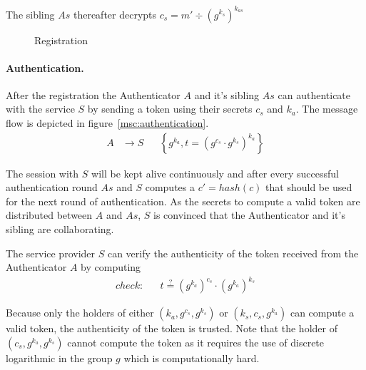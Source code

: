 The sibling $As$ thereafter decrypts $c_s = m' \div {\left(g^{k_s}\right)^{k_{as}}}$

\begin{figure}
\begin{msc}{Registration}

\setlength{\instdist}{2.5cm}
\setlength{\actionwidth}{2.6cm}

\nextlevel
{}
\nextlevel[3]
\nextlevel
{}
\nextlevel[3]
\end{msc}
\caption{}
\label{msc:registration}
\end{figure}

\paragraph{Authentication.}
After the registration the Authenticator $A$ and it's sibling $As$ can authenticate with the service $S$ by sending a token using their secrets $c_s$ and $k_a$. The message flow is depicted in figure~\ref{msc:authentication}.
\begin{align}
A   &\rightarrow S      &&  \left\{ g^{k_a}, t = \left( g^{c_s} \cdot g^{k_s} \right)^{k_a} \right\}
\end{align}

The session with $S$ will be kept alive continuously and after every successful authentication round $As$ and $S$ computes a $c' = hash(c)$ that should be used for the next round of authentication. As the secrets to compute a valid token are distributed between $A$ and $As$, $S$ is convinced that the Authenticator and it's sibling are collaborating.

The service provider $S$ can verify the authenticity of the token received from the Authenticator $A$ by computing
\begin{align*}
check: && t \stackrel{?}{=} \left(g^{k_a}\right)^{c_s} \cdot \left(g^{k_a}\right)^{k_s}
\end{align*}

Because only the holders of either $\left(k_a,g^{c_s},g^{k_s}\right)$ or $\left(k_s,c_s,g^{k_a}\right)$ can compute a valid token, the authenticity of the token is trusted. Note that the holder of $\left(c_s,g^{k_a},g^{k_s}\right)$ cannot compute the token as
it requires the use of discrete logarithmic in the group $g$ which is computationally hard.



